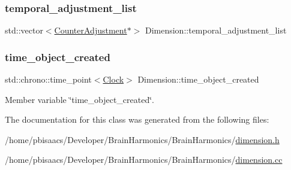 \subsubsection{\texorpdfstring{temporal\+\_\+adjustment\+\_\+list}{temporal\_adjustment\_list}}
{\footnotesize\ttfamily std\+::vector$<$\mbox{\hyperlink{structDimension_1_1CounterAdjustment}{Counter\+Adjustment}}$\ast$$>$ Dimension\+::temporal\+\_\+adjustment\+\_\+list}

\mbox{\label{classDimension_a99ba1a7fe44c7e52520144ab4793cad3}} 
\subsubsection{\texorpdfstring{time\+\_\+object\+\_\+created}{time\_object\_created}}
{\footnotesize\ttfamily std\+::chrono\+::time\+\_\+point$<$\mbox{\hyperlink{universe_8h_a0ef8d951d1ca5ab3cfaf7ab4c7a6fd80}{Clock}}$>$ Dimension\+::time\+\_\+object\+\_\+created\hspace{0.3cm}{\ttfamily [protected]}}



Member variable \char`\"{}time\+\_\+object\+\_\+created\char`\"{}. 



The documentation for this class was generated from the following files\+:\begin{DoxyCompactItemize}
\item 
/home/pbisaacs/\+Developer/\+Brain\+Harmonics/\+Brain\+Harmonics/\mbox{\hyperlink{dimension_8h}{dimension.\+h}}\item 
/home/pbisaacs/\+Developer/\+Brain\+Harmonics/\+Brain\+Harmonics/\mbox{\hyperlink{dimension_8cc}{dimension.\+cc}}\end{DoxyCompactItemize}
